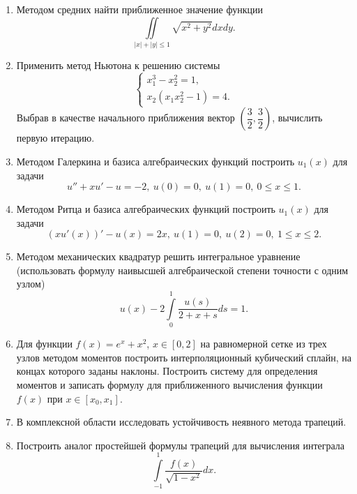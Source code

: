 \documentclass[a4paper, 12pt]{article}
\renewcommand{\leq}{\leqslant}
\begin{document}
\begin{enumerate}
		\item Методом средних найти приближенное значение функции $$\iint\limits_{|x| + |y| \leq 1} \sqrt{x^2 + y^2} dxdy.$$
		\item Применить метод Ньютона к решению системы $$\begin{cases}
		x_1^3 -x_2^2=1,\\
		x_2(x_1 x_2^2 - 1) = 4.
		\end{cases}$$
		Выбрав в качестве начального приближения вектор $\left(\dfrac 32, \dfrac 32\right)$, вычислить первую итерацию.
		\item Методом Галеркина и базиса алгебраических функций построить $u_1(x)$ для задачи
		$$u'' + xu' - u = -2,\ 
		u(0) = 0,\
		u(1) = 0,\ 0\leq x\leq 1.$$
		\item Методом Ритца и базиса алгебраических функций построить $u_1(x)$ для задачи
		$$(xu'(x))'-u(x)=2x,\
		u(1)=0,\
		u(2)=0,\
		1\leq x\leq 2.$$
		\item Методом механических квадратур решить интегральное уравнение (использовать формулу наивысшей алгебраической степени точности с одним узлом)
		$$u(x) - 2\int\limits_0^1 \dfrac{u(s)}{2+x+s}ds=1.$$
		\item Для функции $f(x) = e^x+x^2$, $x\in [0,2]$ на равномерной сетке из трех узлов методом моментов построить интерполяционный кубический сплайн, на концах которого заданы наклоны. Построить систему для определения моментов и записать формулу для приближенного вычисления функции $f(x)$ при $x\in [x_0, x_1]$.
		\item В комплексной области исследовать устойчивость неявного метода трапеций.
		\item Построить аналог простейшей формулы трапеций для вычисления интеграла $$\int\limits_{-1}^1 \dfrac{f(x)}{\sqrt{1-x^2}}dx.$$
	\end{enumerate}
	
\end{document}
